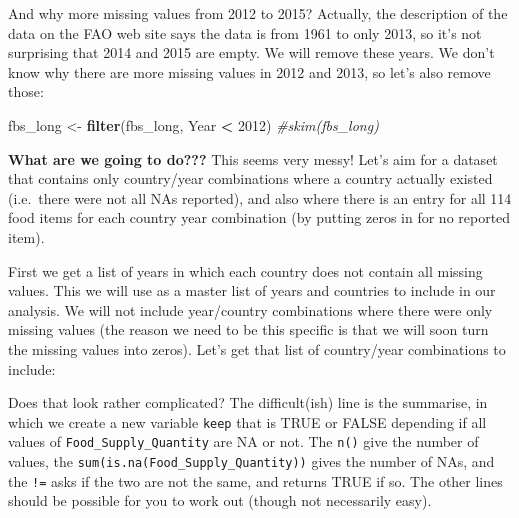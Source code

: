 \documentclass[]{book}
\newenvironment{Shaded}{\begin{snugshade}}{\end{snugshade}}
\newcommand{\CommentTok}[1]{\textcolor[rgb]{0.56,0.35,0.01}{\textit{#1}}}
\newcommand{\DataTypeTok}[1]{\textcolor[rgb]{0.13,0.29,0.53}{#1}}
\newcommand{\DecValTok}[1]{\textcolor[rgb]{0.00,0.00,0.81}{#1}}
\newcommand{\KeywordTok}[1]{\textcolor[rgb]{0.13,0.29,0.53}{\textbf{#1}}}
\newcommand{\NormalTok}[1]{#1}
\newcommand{\OperatorTok}[1]{\textcolor[rgb]{0.81,0.36,0.00}{\textbf{#1}}}
\newcommand{\StringTok}[1]{\textcolor[rgb]{0.31,0.60,0.02}{#1}}
\begin{document}
And why more missing values from 2012 to 2015? Actually, the description of the data on the FAO web site says the data is from 1961 to only 2013, so it's not surprising that 2014 and 2015 are empty. We will remove these years. We don't know why there are more missing values in 2012 and 2013, so let's also remove those:

\begin{Shaded}
\begin{Highlighting}[]
\NormalTok{fbs_long <-}\StringTok{ }\KeywordTok{filter}\NormalTok{(fbs_long, Year }\OperatorTok{<}\StringTok{ }\DecValTok{2012}\NormalTok{)}
\CommentTok{#skim(fbs_long)}
\end{Highlighting}
\end{Shaded}

\textbf{What are we going to do???} This seems very messy! Let's aim for a dataset that contains only country/year combinations where a country actually existed (i.e.~there were not all NAs reported), and also where there is an entry for all 114 food items for each country year combination (by putting zeros in for no reported item).

First we get a list of years in which each country does not contain all missing values. This we will use as a master list of years and countries to include in our analysis. We will not include year/country combinations where there were only missing values (the reason we need to be this specific is that we will soon turn the missing values into zeros). Let's get that list of country/year combinations to include:

\begin{Shaded}
\end{Shaded}

Does that look rather complicated? The difficult(ish) line is the summarise, in which we create a new variable \texttt{keep} that is TRUE or FALSE depending if all values of \texttt{Food\_Supply\_Quantity} are NA or not. The \texttt{n()} give the number of values, the \texttt{sum(is.na(Food\_Supply\_Quantity))} gives the number of NAs, and the \texttt{!=} asks if the two are not the same, and returns TRUE if so. The other lines should be possible for you to work out (though not necessarily easy).
\end{document}
